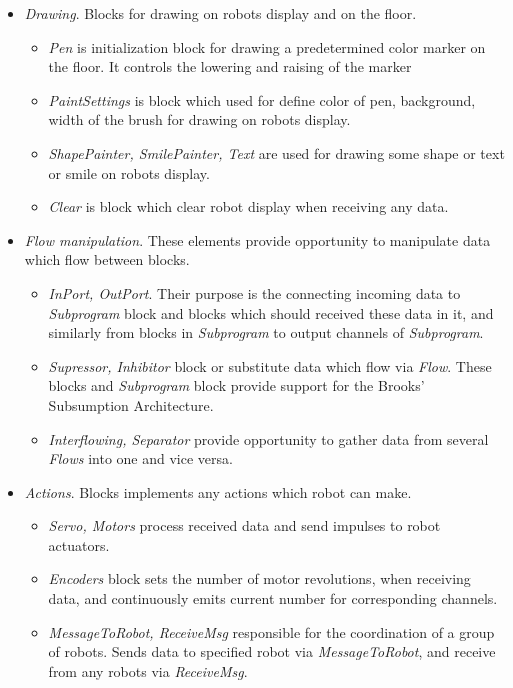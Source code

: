 \documentclass[conference,compsoc]{IEEEtran}
\begin{document}
\begin{itemize}
\begin{itemize}
\end{itemize} 
\item \textit{Drawing}. Blocks for drawing on robots display and on the floor.
\begin{itemize}
\item \textit{Pen} is initialization block for drawing a predetermined color marker on the floor.  It controls the lowering and raising of the marker
\item \textit{PaintSettings} is block which used for define color of pen, background, width of the brush for drawing on robots display.
\item \textit{ShapePainter, SmilePainter, Text} are used for drawing some shape or text or smile on robots display. 
\item \textit{Clear} is block which clear robot display when receiving any data.
\end{itemize} 
\item \textit{Flow manipulation}. These elements provide opportunity to manipulate data which flow between blocks.
\begin{itemize}
\item \textit{InPort, OutPort}. Their purpose is the connecting incoming data to \textit{Subprogram} block and blocks which should received these data in it, and similarly from blocks in \textit{Subprogram} to output channels of \textit{Subprogram}. 
\item \textit{Supressor, Inhibitor} block or substitute data which flow via \textit{Flow}. These blocks and \textit{Subprogram} block provide support for the Brooks' Subsumption Architecture. 
\item \textit{Interflowing, Separator} provide opportunity to gather data from several \textit{Flows} into one and vice versa.
\end{itemize} 
\item \textit{Actions}. Blocks implements any actions which robot can make.
\begin{itemize}
\item \textit{Servo, Motors} process received data and send impulses to robot actuators.
\item \textit{Encoders} block sets the number of motor revolutions, when receiving data, and continuously emits current number for corresponding channels.
\item \textit{MessageToRobot, ReceiveMsg} responsible for the coordination of a group of robots. Sends data to specified robot via \textit{MessageToRobot}, and receive from any robots via \textit{ReceiveMsg}.

\end{itemize}
\end{itemize}
\end{document}
